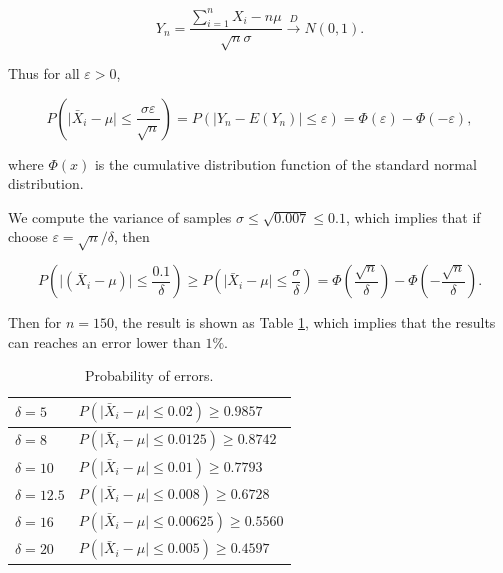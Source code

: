 \documentclass[11pt]{article}
\begin{document}
$$
    Y_n = \frac{\sum_{i=1}^n X_i - n \mu}{\sqrt{n} \sigma} \xrightarrow{D} N(0, 1).
$$

Thus for all $\varepsilon > 0$,

$$
    P\left(\vert \bar{X}_i - \mu \vert \leq \frac{\sigma \varepsilon}{\sqrt{n}}\right) = P(\vert Y_n - E(Y_n) \vert \leq \varepsilon) = \varPhi(\varepsilon) - \varPhi(-\varepsilon),
$$

where $\varPhi(x)$ is the cumulative distribution function of the standard normal distribution.

We compute the variance of samples $\sigma \leq \sqrt{0.007} \leq 0.1$, which implies that if choose $\varepsilon = \sqrt{n} / \delta$, then

$$
    P\left(\vert (\bar{X}_i - \mu)\vert \leq \frac{0.1}{\delta}\right) \geq P\left(\vert \bar{X}_i - \mu \vert \leq \frac{\sigma}{\delta}\right) = \varPhi\left(\frac{\sqrt{n}}{\delta}\right) - \varPhi\left(-\frac{\sqrt{n}}{\delta}\right).
$$

Then for $n = 150$, the result is shown as Table \ref{table-a-as-repetitions}, which implies that the results can reaches an error lower than $1\%$.

\begin{table}[H]
    \centering
    \begin{tabular}{|l|l|}
        \hline
        $\delta = 5$    & $P(\vert \bar{X}_i - \mu \vert \leq 0.02) \geq 0.9857$    \\
        \hline
        $\delta = 8$    & $P(\vert \bar{X}_i - \mu \vert \leq 0.0125) \geq 0.8742$  \\
        \hline
        $\delta = 10$   & $P(\vert \bar{X}_i - \mu \vert \leq 0.01) \geq 0.7793$    \\
        \hline
        $\delta = 12.5$ & $P(\vert \bar{X}_i - \mu \vert \leq 0.008) \geq 0.6728$   \\
        \hline
        $\delta = 16$   & $P(\vert \bar{X}_i - \mu \vert \leq 0.00625) \geq 0.5560$ \\
        \hline
        $\delta = 20$   & $P(\vert \bar{X}_i - \mu \vert \leq 0.005) \geq 0.4597$   \\
        \hline
    \end{tabular}
    \caption{Probability of errors.}
    \label{table-a-as-repetitions}
\end{table}
\end{document}
